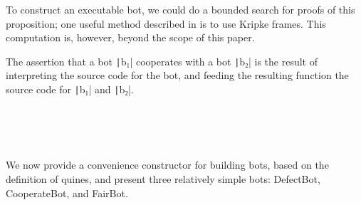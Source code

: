   To construct an executable bot, we could do a bounded search for
  proofs of this proposition; one useful method described in
  \cite{BaraszChristianoFallensteinEtAl2014} is to use Kripke frames.
  This computation is, however, beyond the scope of this paper.

  The assertion that a bot \texttt|b₁| cooperates with a bot
  \texttt|b₂| is the result of interpreting the source code
  for the bot, and feeding the resulting function the source code for
  \texttt|b₁| and \texttt|b₂|.

\begin{code}%
\> \<%
\\
\> \<%
\\
\>  \AgdaSymbol{:}        \<%
\\
\>    \AgdaSymbol{=}  \AgdaSymbol{(}    \AgdaSymbol{(} \AgdaSymbol{)} \AgdaSymbol{(} \AgdaSymbol{))}\<%
\end{code}

  We now provide a convenience constructor for building bots, based on
  the definition of quines, and present three relatively simple bots:
  DefectBot, CooperateBot, and FairBot.

